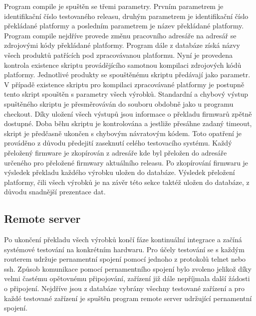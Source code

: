 Program compile je spuštěn se třemi parametry. Prvním parametrem je identifikační číslo testovaného releasu, druhým parametrem je identifikační číslo překládané platformy a posledním parametrem je název překládané platformy. Program compile nejdříve provede změnu pracovního adresáře na adresář se zdrojovými kódy překládané platformy. Program dále z databáze získá názvy všech produktů patřících pod zpracovávanou platformu. Nyní je provedena kontrola existence skriptu provádějícího samotnou kompilaci zdrojových kódů platformy. Jednotlivé produkty se spouštěnému skriptu předávají jako parametr. V případě existence skriptu pro kompilaci zpracovávané platformy je postupně tento skript spouštěn s parametry všech výrobků. Standardní a chybový výstup spuštěného skriptu je přesměrováván do souboru obdobně jako u programu checkout. Díky uložení všech výstupů jsou informace o překladu firmwarů zpětně dostupné. Doba běhu skriptu je kontrolována a jestliže přesáhne zadaný timeout, skript je předčasně ukončen s chybovým návratovým kódem. Toto opatření je prováděno z důvodu předejití zaseknutí celého testovacího systému. Každý přeložený firmware je zkopírován z adresáře kde byl přeložen do adresáře určeného pro přeložené firmwary aktuálního releasu. Po zkopírování firmwaru je výsledek překladu každého výrobku uložen do databáze. Výsledek přeložení platformy, čili všech výrobků je na závěr této sekce taktéž uložen do databáze, z důvodu snadnější prezentace dat.

\subsection{Remote server}
Po ukončení překladu všech výrobků končí fáze kontinuální integrace a začíná systémové testování na konkrétním hardwaru. Pro účely testování se s každým routerem udržuje pernamentní spojení pomocí jednoho z protokolů telnet nebo ssh. Způsob komunikace pomocí pernamentního spojení bylo zvoleno jelikož díky velmi častému opětovnému připojování, zařízení již dále nepříjmala další žádosti o připojení. Nejdříve jsou z databáze vybrány všechny testované zařízení a pro každé testované zařízení je spuštěn program remote server udržující pernamentní spojení.

